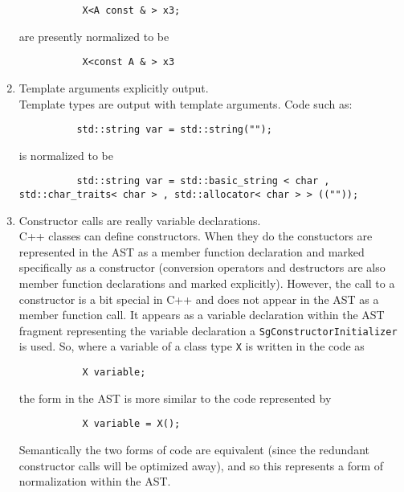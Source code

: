 \begin{enumerate}
{{\begin{verbatim}
           X<A const & > x3;
\end{verbatim}
}}
     are presently normalized to be
{\indent
{\mySmallFontSize

\begin{verbatim}
           X<const A & > x3
\end{verbatim}
}}
     \item Template arguments explicitly output. \\
          Template types are output with template arguments.
     Code such as:
{\indent
{\mySmallFontSize
\begin{verbatim}
          std::string var = std::string("");
\end{verbatim}
}}
     is normalized to be
{\indent
{\mySmallFontSize
\begin{verbatim}
          std::string var = std::basic_string < char , std::char_traits< char > , std::allocator< char > > ((""));
\end{verbatim}
}}

     \item Constructor calls are really variable declarations. \\
          C++ classes can define constructors. When they do the constuctors 
     are represented in the AST as a member function declaration and marked
     specifically as a constructor (conversion operators and destructors are
     also member function declarations and marked explicitly).  However,
     the call to a constructor is a bit special in C++ and does not appear
     in the AST as a member function call. It appears as a variable declaration
     within the AST fragment representing the variable declaration a
     {\tt SgConstructorInitializer} is used.  So, where a variable of a class type {\tt X} 
     is written in the code as
{\indent
{\mySmallFontSize
\begin{verbatim}
           X variable;
\end{verbatim}
}}
     the form in the AST is more similar to the code represented by
{\indent
{\mySmallFontSize
\begin{verbatim}
           X variable = X();
\end{verbatim}
}}
     Semantically the two forms of code are equivalent (since the redundant constructor calls will
     be optimized away), and so this represents a form of normalization within the AST.


\end{enumerate}
